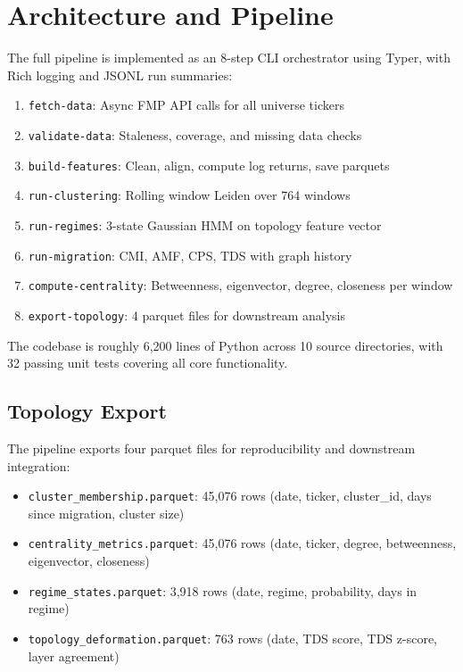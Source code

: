 \documentclass[12pt, letterpaper]{article}
\begin{document}
\section{Architecture and Pipeline}

The full pipeline is implemented as an 8-step CLI orchestrator using Typer, with Rich logging and JSONL run summaries:

\begin{enumerate}
    \item \texttt{fetch-data}: Async FMP API calls for all universe tickers
    \item \texttt{validate-data}: Staleness, coverage, and missing data checks
    \item \texttt{build-features}: Clean, align, compute log returns, save parquets
    \item \texttt{run-clustering}: Rolling window Leiden over 764 windows
    \item \texttt{run-regimes}: 3-state Gaussian HMM on topology feature vector
    \item \texttt{run-migration}: CMI, AMF, CPS, TDS with graph history
    \item \texttt{compute-centrality}: Betweenness, eigenvector, degree, closeness per window
    \item \texttt{export-topology}: 4 parquet files for downstream analysis
\end{enumerate}

The codebase is roughly 6,200 lines of Python across 10 source directories, with 32 passing unit tests covering all core functionality.

\subsection{Topology Export}

The pipeline exports four parquet files for reproducibility and downstream integration:

\begin{itemize}
    \item \texttt{cluster\_membership.parquet}: 45,076 rows (date, ticker, cluster\_id, days since migration, cluster size)
    \item \texttt{centrality\_metrics.parquet}: 45,076 rows (date, ticker, degree, betweenness, eigenvector, closeness)
    \item \texttt{regime\_states.parquet}: 3,918 rows (date, regime, probability, days in regime)
    \item \texttt{topology\_deformation.parquet}: 763 rows (date, TDS score, TDS z-score, layer agreement)
\end{itemize}
\end{document}
